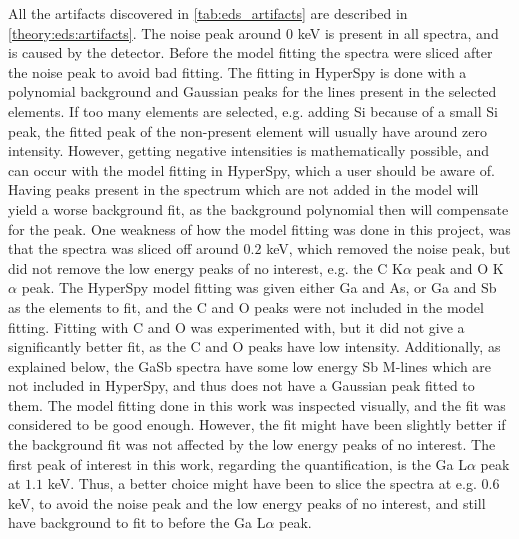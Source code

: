 All the artifacts discovered in \cref{tab:eds_artifacts} are described in \cref{theory:eds:artifacts}.
The noise peak around $0$ keV is present in all spectra, and is caused by the detector.
Before the model fitting the spectra were sliced after the noise peak to avoid bad fitting.
The fitting in HyperSpy is done with a polynomial background and Gaussian peaks for the lines present in the selected elements.
If too many elements are selected, e.g. adding Si because of a small Si peak, the fitted peak of the non-present element will usually have around zero intensity.
However, getting negative intensities is mathematically possible, and can occur with the model fitting in HyperSpy, which a user should be aware of.
Having peaks present in the spectrum which are not added in the model will yield a worse background fit, as the background polynomial then will compensate for the peak.
One weakness of how the model fitting was done in this project, was that the spectra was sliced off around $0.2$ keV, which removed the noise peak, but did not remove the low energy peaks of no interest, e.g. the C K$\alpha$ peak and O K$\alpha$ peak.
The HyperSpy model fitting was given either Ga and As, or Ga and Sb as the elements to fit, and the C and O peaks were not included in the model fitting.
Fitting with C and O was experimented with, but it did not give a significantly better fit, as the C and O peaks have low intensity.
Additionally, as explained below, the GaSb spectra have some low energy Sb M-lines which are not included in HyperSpy, and thus does not have a Gaussian peak fitted to them.
The model fitting done in this work was inspected visually, and the fit was considered to be good enough.
However, the fit might have been slightly better if the background fit was not affected by the low energy peaks of no interest.
The first peak of interest in this work, regarding the quantification, is the Ga L$\alpha$ peak at $1.1$ keV.
Thus, a better choice might have been to slice the spectra at e.g. $0.6$ keV, to avoid the noise peak and the low energy peaks of no interest, and still have background to fit to before the Ga L$\alpha$ peak.

